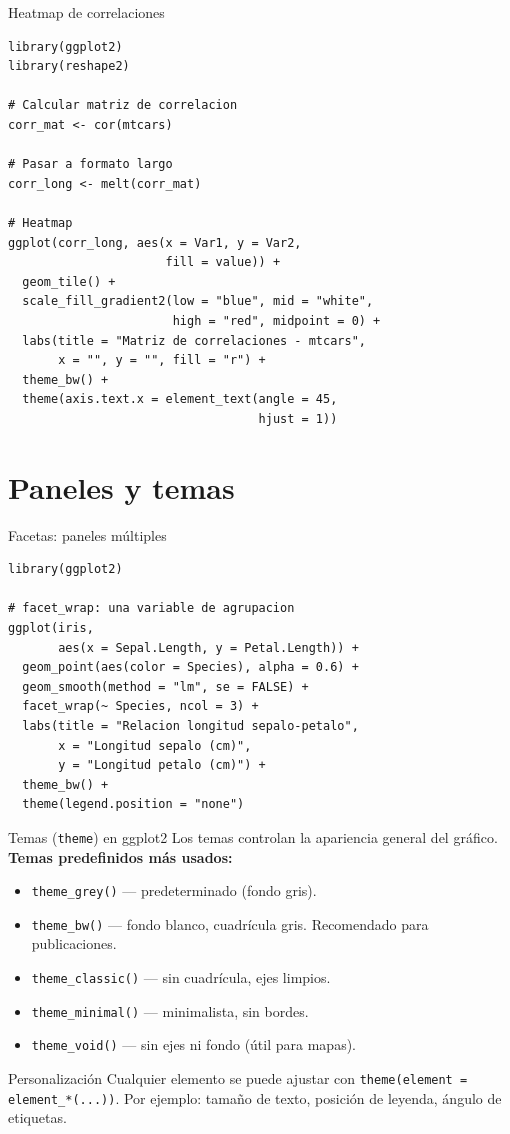 \documentclass[aspectratio=169]{beamer}
\begin{document}
\begin{frame}[fragile]{Heatmap de correlaciones}
\begin{lstlisting}[style=rcode]
library(ggplot2)
library(reshape2)

# Calcular matriz de correlacion
corr_mat <- cor(mtcars)

# Pasar a formato largo
corr_long <- melt(corr_mat)

# Heatmap
ggplot(corr_long, aes(x = Var1, y = Var2,
                      fill = value)) +
  geom_tile() +
  scale_fill_gradient2(low = "blue", mid = "white",
                       high = "red", midpoint = 0) +
  labs(title = "Matriz de correlaciones - mtcars",
       x = "", y = "", fill = "r") +
  theme_bw() +
  theme(axis.text.x = element_text(angle = 45,
                                   hjust = 1))
\end{lstlisting}
\end{frame}

\section{Paneles y temas}

\begin{frame}[fragile]{Facetas: paneles múltiples}
\begin{lstlisting}[style=rcode]
library(ggplot2)

# facet_wrap: una variable de agrupacion
ggplot(iris,
       aes(x = Sepal.Length, y = Petal.Length)) +
  geom_point(aes(color = Species), alpha = 0.6) +
  geom_smooth(method = "lm", se = FALSE) +
  facet_wrap(~ Species, ncol = 3) +
  labs(title = "Relacion longitud sepalo-petalo",
       x = "Longitud sepalo (cm)",
       y = "Longitud petalo (cm)") +
  theme_bw() +
  theme(legend.position = "none")
\end{lstlisting}
\end{frame}

\begin{frame}{Temas (\texttt{theme}) en ggplot2}
  Los temas controlan la apariencia general del gráfico.
  \bigskip
  \textbf{Temas predefinidos más usados:}
  \begin{itemize}
    \item \texttt{theme\_grey()} — predeterminado (fondo gris).
    \item \texttt{theme\_bw()} — fondo blanco, cuadrícula gris. Recomendado para publicaciones.
    \item \texttt{theme\_classic()} — sin cuadrícula, ejes limpios.
    \item \texttt{theme\_minimal()} — minimalista, sin bordes.
    \item \texttt{theme\_void()} — sin ejes ni fondo (útil para mapas).
  \end{itemize}
  \bigskip
  \begin{block}{Personalización}
    Cualquier elemento se puede ajustar con \texttt{theme(element = element\_*(...))}. Por ejemplo: tamaño de texto, posición de leyenda, ángulo de etiquetas.
  \end{block}
\end{frame}
\end{document}
